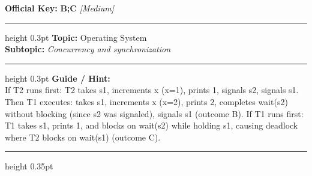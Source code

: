 \documentclass[a4paper,10pt]{article}
\begin{document}
\begin{tcolorbox}
\textbf{Official Key:} \textbf{\large B;C} \hfill \textit{\small [Medium]}
\vspace{2pt}\hrule height 0.3pt\vspace{3pt}
\textbf{Topic:} Operating System \\
\textbf{Subtopic:} \textit{Concurrency and synchronization}
\vspace{2pt}\hrule height 0.3pt\vspace{3pt}
\textbf{Guide / Hint:} \\
{\small If T2 runs first: T2 takes s1, increments x (x=1), prints 1, signals s2, signals s1. Then T1 executes: takes s1, increments x (x=2), prints 2, completes wait(s2) without blocking (since s2 was signaled), signals s1 (outcome B). If T1 runs first: T1 takes s1, prints 1, and blocks on wait(s2) while holding s1, causing deadlock where T2 blocks on wait(s1) (outcome C).}

\end{tcolorbox}
\vspace{6pt}\hrule height 0.35pt\vspace{6pt}
\noindent
\end{document}

